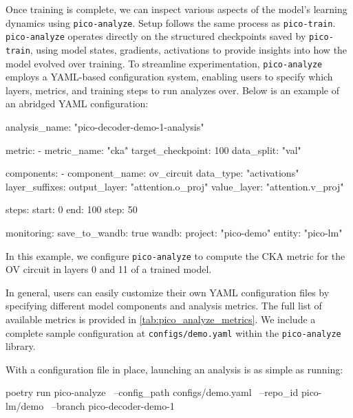 Once training is complete, we can inspect various aspects of the model's learning dynamics using \texttt{pico-analyze}. Setup follows the same process as \texttt{pico-train}. \texttt{pico-analyze} operates directly on the structured checkpoints saved by \texttt{pico-train}, using model states, gradients, activations to provide insights into how the model evolved over training. To streamline experimentation, \texttt{pico-analyze} employs a YAML-based configuration system, enabling users to specify which layers, metrics, and training steps to run analyzes over. Below is an example of an abridged YAML configuration:

\begin{center}
    \begin{configlisting}
        analysis_name: "pico-decoder-demo-1-analysis"

        metric: 
            - metric_name: "cka"
              target_checkpoint: 100
              data_split: "val"

              components:
                - component_name: ov_circuit
                  data_type: "activations"
                  layer_suffixes:
                    output_layer: "attention.o_proj"
                    value_layer: "attention.v_proj"

        steps:
            start: 0
            end: 100
            step: 50

        monitoring:
            save_to_wandb: true
            wandb:
                project: "pico-demo"
                entity: "pico-lm"
    \end{configlisting}
\end{center}

In this example, we configure \texttt{pico-analyze} to compute the CKA metric for the OV circuit in layers 0 and 11 of a trained model.

In general, users can easily customize their own YAML configuration files by specifying different model components and analysis metrics. The full list of available metrics is provided in \cref{tab:pico_analyze_metrics}. We include a complete sample configuration at \texttt{configs/demo.yaml} within the \texttt{pico-analyze} library.

With a configuration file in place, launching an analysis is as simple as running:
\begin{center}
    \begin{codelisting}
        poetry run pico-analyze \
            --config_path configs/demo.yaml \
            --repo_id pico-lm/demo \
            --branch pico-decoder-demo-1
    \end{codelisting}
\end{center}

